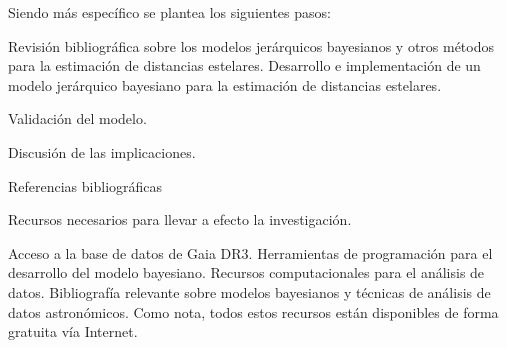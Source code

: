 \documentclass[stu, 12pt, letterpaper, donotrepeattitle, floatsintext, natbib]{apa7}
\begin{document}
Siendo más específico se plantea los siguientes pasos:

Revisión bibliográfica sobre los modelos jerárquicos bayesianos y otros métodos para la estimación de distancias estelares.
Desarrollo e implementación de un modelo jerárquico bayesiano para la estimación de distancias estelares.

Validación del modelo.

Discusión de las implicaciones.

Referencias bibliográficas

Recursos necesarios para llevar a efecto la investigación.

Acceso a la base de datos de Gaia DR3.
Herramientas de programación para el desarrollo del modelo bayesiano.
Recursos computacionales para el análisis de datos.
Bibliografía relevante sobre modelos bayesianos y técnicas de análisis de datos astronómicos.
Como nota, todos estos recursos están disponibles de forma gratuita vía Internet.

\newpage
\renewcommand\refname{\large\textbf{Referencias bibliográficas}}
% 
\end{document}
